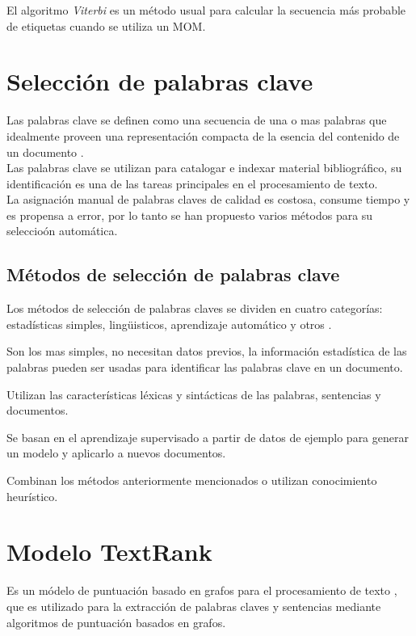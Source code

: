 El algoritmo \emph{Viterbi} es un m\'etodo usual para calcular la secuencia m\'as
probable de etiquetas cuando se utiliza un MOM.



\section{Selecci\'on de palabras clave}
Las palabras clave se definen como una secuencia de una o mas palabras que idealmente
proveen una representaci\'on compacta de la esencia del contenido de un 
documento \cite{REC10}. \\

Las palabras clave se utilizan para catalogar e indexar material bibliogr\'afico,
su identificaci\'on es una de las tareas principales en el procesamiento de texto. \\

La asignaci\'on manual de palabras claves de calidad es costosa, consume tiempo y es
propensa a error, por lo tanto se han propuesto varios m\'etodos para su seleccio\'on
autom\'atica.

\subsection{M\'etodos de selecci\'on de palabras clave}
Los m\'etodos de selecci\'on de palabras claves se dividen en cuatro categor\'ias:
estad\'isticas simples, ling\"uisticos, aprendizaje autom\'atico y otros \cite{ZWW08}.
\begin{description}[leftmargin=0cm]
	\item[Enfoques estad\'isticos] Son los mas simples, no necesitan datos previos,
	la informaci\'on estad\'istica de las palabras pueden ser usadas para identificar
	las palabras clave en un documento.
	\item[Enfoques ling\"uisticos] Utilizan las caracter\'isticas l\'exicas y
	sint\'acticas de las palabras, sentencias y documentos.
	\item[Enfoques de aprendizaje autom\'atico] Se basan en el aprendizaje supervisado
	a partir de datos de ejemplo para generar un modelo y aplicarlo a nuevos
	documentos.
	\item[Otros enfoques] Combinan los m\'etodos anteriormente mencionados o utilizan
	conocimiento heur\'istico.
\end{description}

\section{Modelo TextRank}
Es un m\'odelo de puntuaci\'on basado en grafos para el procesamiento de
texto \cite{RMPT04}, que es utilizado para la extracci\'on de palabras claves
y sentencias mediante algoritmos de puntuaci\'on basados en grafos.

